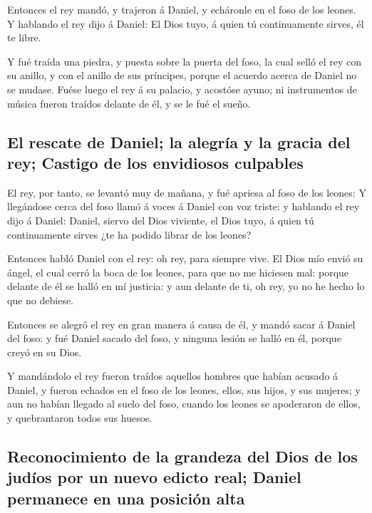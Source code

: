  Entonces el rey mandó, y trajeron á Daniel, y echáronle
en el foso de los leones. Y hablando el rey dijo á Daniel: El Dios tuyo,
á quien tú continuamente sirves, él te libre.

 Y fué traída una piedra, y puesta sobre la puerta del
foso, la cual selló el rey con su anillo, y con el anillo de sus
príncipes, porque el acuerdo acerca de Daniel no se mudase.
 Fuése luego el rey á su palacio, y acostóse ayuno; ni
instrumentos de música fueron traídos delante de él, y se le fué el
sueño.

\hypertarget{el-rescate-de-daniel-la-alegruxeda-y-la-gracia-del-rey-castigo-de-los-envidiosos-culpables}{%
\subsection{El rescate de Daniel; la alegría y la gracia del rey;
Castigo de los envidiosos
culpables}\label{el-rescate-de-daniel-la-alegruxeda-y-la-gracia-del-rey-castigo-de-los-envidiosos-culpables}}

 El rey, por tanto, se levantó muy de mañana, y fué
apriesa al foso de los leones:  Y llegándose cerca del
foso llamó á voces á Daniel con voz triste: y hablando el rey dijo á
Daniel: Daniel, siervo del Dios viviente, el Dios tuyo, á quien tú
continuamente sirves ¿te ha podido librar de los leones?

 Entonces habló Daniel con el rey: oh rey, para siempre
vive.  El Dios mío envió su ángel, el cual cerró la boca
de los leones, para que no me hiciesen mal: porque delante de él se
halló en mí justicia: y aun delante de ti, oh rey, yo no he hecho lo que
no debiese.

 Entonces se alegró el rey en gran manera á causa de él,
y mandó sacar á Daniel del foso: y fué Daniel sacado del foso, y ninguna
lesión se halló en él, porque creyó en su Dios.

 Y mandándolo el rey fueron traídos aquellos hombres que
habían acusado á Daniel, y fueron echados en el foso de los leones,
ellos, sus hijos, y sus mujeres; y aun no habían llegado al suelo del
foso, cuando los leones se apoderaron de ellos, y quebrantaron todos sus
huesos.

\hypertarget{reconocimiento-de-la-grandeza-del-dios-de-los-juduxedos-por-un-nuevo-edicto-real-daniel-permanece-en-una-posiciuxf3n-alta}{%
\subsection{Reconocimiento de la grandeza del Dios de los judíos por un
nuevo edicto real; Daniel permanece en una posición
alta}\label{reconocimiento-de-la-grandeza-del-dios-de-los-juduxedos-por-un-nuevo-edicto-real-daniel-permanece-en-una-posiciuxf3n-alta}}

